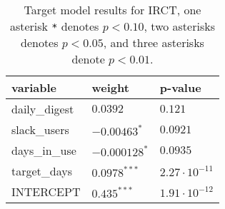 \renewcommand{\arraystretch}{1.2}
\begin{table}
\begin{center}
\begin{tabular}{|p{4cm}|p{4cm}|p{4cm}|} 
\hline
variable & weight & p-value \\ [0.5ex]
\hline\hline

daily\_digest & $0.0392^{}$ & $0.121$ \\
slack\_users & $-0.00463^{*}$ & $0.0921$ \\
days\_in\_use & $-0.000128^{*}$ & $0.0935$ \\
target\_days & $0.0978^{***}$ & $2.27\cdot10^{-11}$ \\

\hline\hline
INTERCEPT & $0.435^{***}$ & $1.91\cdot10^{-12}$ \\

\hline
\end{tabular}
\caption{Target model results for IRCT, one asterisk \texttt{*} denotes  $p < 0.10$, two asterisks denotes $p < 0.05$, and three asterisks denote $p < 0.01$.}
\label{tab:target-irct-results}
\end{center}
\end{table}